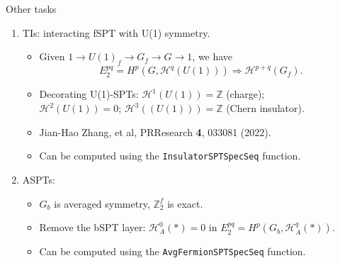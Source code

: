 \documentclass[xcolor=table, aspectratio=169,ignorenonframetext]{beamer}
\begin{document}
\begin{frame}{Other tasks}
	\begin{enumerate}
		\item TIs: interacting fSPT with U(1) symmetry.
		\begin{itemize}
			\item Given $1\rightarrow U(1)_f\rightarrow G_f\rightarrow G\rightarrow 1$, we have
			\[E_2^{pq}=H^p(G, \mathcal H^q(U(1)))\Rightarrow \mathcal H^{p+q}(G_f).\]
      \item Decorating U(1)-SPTs: $\mathcal H^1(U(1))=\mathbb Z$ (charge);\\ $\mathcal H^2(U(1))=0$;
        $\mathcal H^3((U(1)))=\mathbb Z$ (Chern insulator).
			\item Jian-Hao Zhang, et al, PRResearch \textbf{4}, 033081 (2022).
			\item Can be computed using the \lstinline|InsulatorSPTSpecSeq| function.
		\end{itemize}

		\item ASPTs:
		\begin{itemize}
			\item $G_b$ is averaged symmetry, $\mathbb Z_2^f$ is exact.
			\item Remove the bSPT layer: $\mathcal H^0_A(*)=0$ in $E_2^{pq}=H^p(G_b, \mathcal H^q_A(*))$.
			\item Can be computed using the \lstinline|AvgFermionSPTSpecSeq| function.
		\end{itemize}
	\end{enumerate}
\end{frame}

\end{document}
